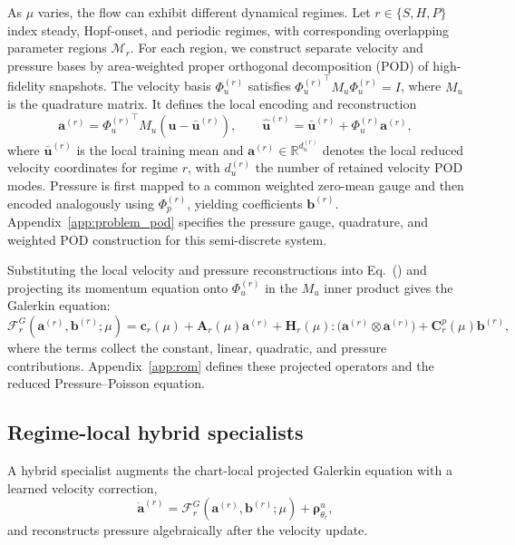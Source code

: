 As $\mu$ varies, the flow can exhibit different dynamical regimes. Let $r\in\{S,H,P\}$ index steady, Hopf-onset, and periodic regimes, with corresponding overlapping parameter regions $\mathcal M_r$. For each region, we construct separate velocity and pressure bases by area-weighted proper orthogonal decomposition (POD) of  high-fidelity snapshots. The velocity basis
$\Phi_u^{(r)}$ satisfies ${\Phi_u^{(r)}}^\top M_u\Phi_u^{(r)}=I$,
where $M_u$ is the quadrature matrix. It defines the local encoding
and reconstruction
\begin{equation}
  \bm a^{(r)}={\Phi_u^{(r)}}^{\top}M_u(\bm u-\bar{\bm u}^{(r)}),\qquad
  \widehat{\bm u}^{(r)}=\bar{\bm u}^{(r)}+\Phi_u^{(r)}\bm a^{(r)},
  \label{eq:main_chart}
\end{equation}
where \(\bar{\bm u}^{(r)}\) is the local training mean and \(\bm a^{(r)} \in \mathbb{R}^{d_u^{(r)}}\) denotes the local reduced velocity coordinates for regime \(r\), with \(d_u^{(r)}\) the number of retained velocity POD modes. Pressure is first mapped to a common weighted zero-mean gauge and then encoded analogously using $\Phi_p^{(r)}$, yielding coefficients $\bm b^{(r)}$. Appendix~\ref{app:problem_pod} specifies the pressure gauge, quadrature, and weighted POD construction for this semi-discrete system.

Substituting the local velocity and pressure reconstructions into Eq.~() and projecting its momentum equation onto $\Phi_u^{(r)}$ in the $M_u$ inner product gives the Galerkin equation:
\begin{equation}
  \mathcal F_r^{G}(\bm a^{(r)},\bm b^{(r)};\mu)
  =\bm c_r(\mu)+\bm A_r(\mu)\bm a^{(r)}
  +\bm H_r(\mu):\bigl(\bm a^{(r)}\otimes\bm a^{(r)}\bigr)
  +\bm C_r^p(\mu)\bm b^{(r)},
  \label{eq:main_galerkin_backbone}
\end{equation}
where the terms collect the constant, linear, quadratic, and pressure
contributions.  Appendix~\ref{app:rom} defines these projected operators and the reduced Pressure--Poisson equation.


\subsection{Regime-local hybrid specialists}
\label{sec:hybrid_specialists}

A hybrid specialist augments the chart-local projected Galerkin equation with a learned velocity correction,
\begin{equation}
  \dot{\bm a}^{(r)}
  =\mathcal F_r^G(\bm a^{(r)},\bm b^{(r)};\mu)
   +\bm\rho^u_{\theta_r},
  \label{eq:main_specialist}
\end{equation}
and reconstructs pressure algebraically after the velocity update. 

